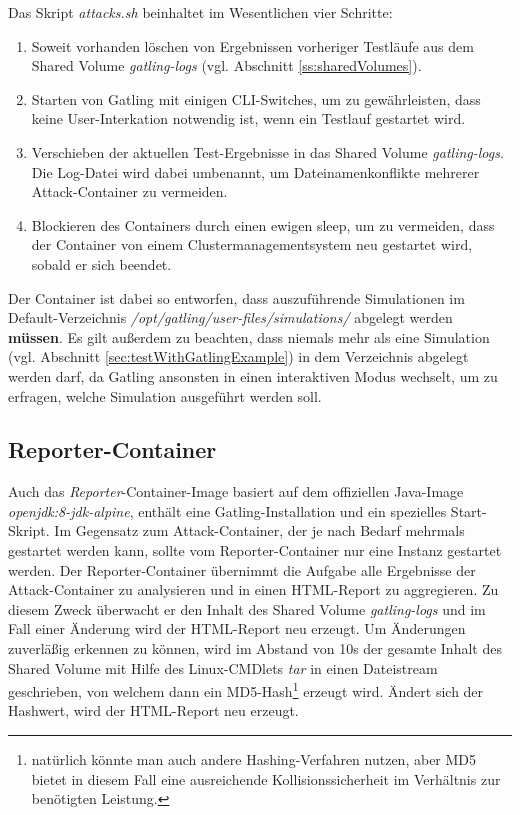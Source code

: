 Das Skript \textit{attacks.sh} beinhaltet im Wesentlichen vier Schritte:

\begin{enumerate}
	\item Soweit vorhanden l\"oschen von Ergebnissen vorheriger Testl\"aufe aus dem Shared Volume \textit{gatling-logs} (vgl. Abschnitt \ref{ss:sharedVolumes}).
	\item Starten von Gatling mit einigen \ac{CLI}-Switches, um zu gew\"ahrleisten, dass keine User-Interkation notwendig ist, wenn ein Testlauf gestartet wird.
	\item Verschieben der aktuellen Test-Ergebnisse in das Shared Volume \textit{gatling-logs}. Die Log-Datei wird dabei umbenannt, um Dateinamenkonflikte mehrerer Attack-Container zu vermeiden.
	\item Blockieren des Containers durch einen ewigen \glqq{}sleep\grqq{}, um zu vermeiden, dass der Container von einem Clustermanagementsystem neu gestartet wird, sobald er sich beendet.
\end{enumerate}

Der Container ist dabei so entworfen, dass auszuf\"uhrende Simulationen im Default-Verzeichnis \textit{/opt/gatling/user-files/simulations/} abgelegt werden \textbf{m\"ussen}.
Es gilt au\ss{}erdem zu beachten, dass niemals mehr als eine Simulation (vgl. Abschnitt \ref{sec:testWithGatlingExample}) in dem Verzeichnis abgelegt werden darf, da Gatling ansonsten in einen interaktiven Modus wechselt, um zu erfragen, welche Simulation ausgef\"uhrt werden soll.

\subsection{Reporter-Container}

Auch das \textit{Reporter}-Container-Image basiert auf dem offiziellen Java-Image \textit{openjdk:8-jdk-alpine}, enth\"alt eine Gatling-Installation und ein spezielles Start-Skript.
Im Gegensatz zum Attack-Container, der je nach Bedarf mehrmals gestartet werden kann, sollte vom Reporter-Container nur eine Instanz gestartet werden.
Der Reporter-Container \"ubernimmt die Aufgabe alle Ergebnisse der Attack-Container zu analysieren und in einen HTML-Report zu aggregieren.
Zu diesem Zweck \"uberwacht er den Inhalt des Shared Volume \textit{gatling-logs} und im Fall einer \"Anderung wird der HTML-Report neu erzeugt.
Um \"Anderungen zuverl\"a\ss{}ig erkennen zu k\"onnen, wird im Abstand von 10s der gesamte Inhalt des Shared Volume mit Hilfe des Linux-CMDlets \textit{tar} in einen Dateistream geschrieben, von welchem dann ein MD5-Hash\footnote{nat\"urlich k\"onnte man auch andere Hashing-Verfahren nutzen, aber MD5 bietet in diesem Fall eine ausreichende Kollisionssicherheit im Verh\"altnis zur ben\"otigten Leistung.} erzeugt wird.
\"Andert sich der Hashwert, wird der HTML-Report neu erzeugt.

